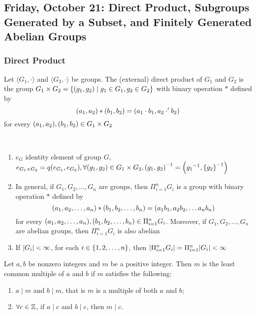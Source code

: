 \subsection{Friday, October 21: Direct Product, Subgroups Generated by a Subset, and Finitely Generated Abelian Groups}

\subsubsection{Direct Product}

\begin{definition}
    Let $\langle G_1, \cdot \rangle$ and $\langle G_2, \cdot \rangle$ be groups. The (external) direct product of $G_1$ and $G_2$ is the group $G_1 \times G_2 = \qty{\qty(g_1, g_2) \mid g_1 \in G_1, g_2 \in G_2}$ with binary operation $\ast$ defined by 
    \[ \qty(a_1, a_2) \ast \qty(b_1, b_2) = \qty(a_1 \cdot b_1, a_2 \cdot' b_2) \]
    for every $\qty(a_1, a_2), \qty(b_1, b_2) \in G_1 \times G_2$
\end{definition}

\begin{remark} \phantom{blank} \\
    \begin{enumerate} 
        \item $e_G$ identity element of group $G$, $e_{G_1 \times G_2} = q\qty(e_{G_1}, e_{G_2}), \forall \qty(g_1, g_2) \in G_1 \times G_2, \qty(g_1, g_2)^{-1} = \qty({g_1}^{-1}, \qty{g_2}^{-1})$
        \item In general, if $G_1, G_2, \ldots, G_n$ are groups, then $\Pi_{i = 1}^{n} G_i$ is a group with binary operation $\ast$ defined by 
        \[ \qty(a_1, a_2, \ldots, a_n) \ast \qty(b_1, b_2, \ldots, b_n) = \qty(a_1b_1, a_2b_2, \ldots a_nb_n) \]
        for every $\qty(a_1, a_2, \ldots, a_n), \qty(b_1, b_2, \ldots, b_n) \in \Pi_{i = 1}^{n} G_i$. Moreover, if $G_1, G_2, \ldots, G_n$ are abelian groups, then $\Pi_{i = 1}^{n} G_i$ is also abelian
        \item If $\qty|G_i| < \infty$, for each $i \in \qty{1, 2, \ldots, n}$, then $\qty|\Pi_{i = 1}^{n} G_i| = \Pi_{i = 1}^{n} \qty|G_i| < \infty$
    \end{enumerate}
\end{remark}

\begin{recall}
    Let $a, b$ be nonzero integers and $m$ be a positive integer. Then $m$ is the least common multiple of $a$ and $b$ if $m$ satisfies the following:
    \vspace{1em}
    \begin{enumerate}
        \item $a \mid m$ and $b \mid m$, that is $m$ is a multiple of both $a$ and $b$;
        \item $\forall c \in \mathbb{Z}$, if $a \mid c$ and $b \mid c$, then $m \mid c$.
    \end{enumerate}
\end{recall}

